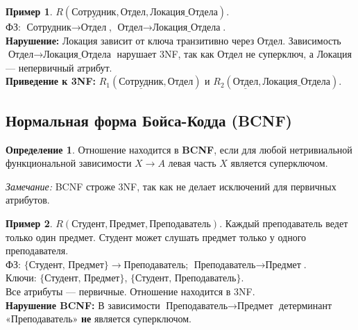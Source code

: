 \documentclass[12pt,a4paper]{article}
\theoremstyle{definition}
\newtheorem{definition}{Определение}
\newtheorem{example}{Пример}
\theoremstyle{plain}
\begin{document}
\begin{example}
$R(\underline{\text{Сотрудник}}, \text{Отдел}, \text{Локация\_Отдела})$. \\
ФЗ: $\text{Сотрудник} \to \text{Отдел}$, $\text{Отдел} \to \text{Локация\_Отдела}$. \\
\textbf{Нарушение:} Локация зависит от ключа транзитивно через Отдел. Зависимость $\text{Отдел} \to \text{Локация\_Отдела}$ нарушает 3NF, так как Отдел не суперключ, а Локация — непервичный атрибут. \\
\textbf{Приведение к 3NF:} $R_1(\underline{\text{Сотрудник}}, \text{Отдел})$ и $R_2(\underline{\text{Отдел}}, \text{Локация\_Отдела})$.
\end{example}

\subsection{Нормальная форма Бойса-Кодда (BCNF)}
\begin{definition}
Отношение находится в \textbf{BCNF}, если для любой нетривиальной функциональной зависимости $X \to A$ левая часть $X$ является суперключом.
\end{definition}
\textit{Замечание:} BCNF строже 3NF, так как не делает исключений для первичных атрибутов.

\begin{example}
$R(\text{Студент}, \text{Предмет}, \text{Преподаватель})$. Каждый преподаватель ведет только один предмет. Студент может слушать предмет только у одного преподавателя. \\
ФЗ: $\{\text{Студент, Предмет}\} \to \text{Преподаватель}$; $\text{Преподаватель} \to \text{Предмет}$. \\
Ключи: $\{\text{Студент, Предмет}\}$, $\{\text{Студент, Преподаватель}\}$. \\
Все атрибуты — первичные. Отношение находится в 3NF. \\
\textbf{Нарушение BCNF:} В зависимости $\text{Преподаватель} \to \text{Предмет}$ детерминант «Преподаватель» \textbf{не} является суперключом.
\end{example}
\end{document}

